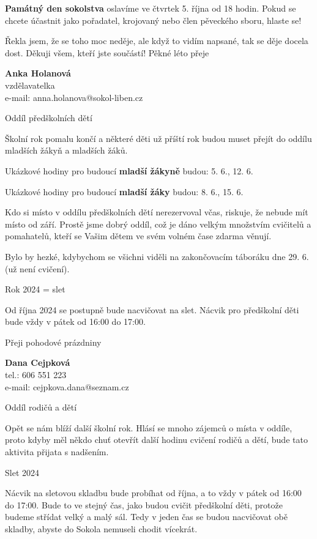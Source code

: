 \documentclass[11pt]{article}
\newcommand{\post}[1]{%
\begin{center}
{\huge \tyrs #1}
\end{center}
}
\newcommand{\subpost}[1]{%
\vspace*{12pt}
\begin{center}
{\Large \tyrs #1}
\end{center}}
\newcommand{\signature}[2]{%
  \begin{flushright}
    \textbf{#1}\\#2
  \end{flushright}
}
\begin{document}
\textbf{Památný den sokolstva} oslavíme ve čtvrtek 5. října od 18 hodin. Pokud se chcete účastnit jako pořadatel, krojovaný nebo člen pěveckého sboru, hlaste se!

Řekla jsem, že se toho moc neděje, ale když to vidím napsané, tak se děje docela dost. Děkuji všem, kteří jste součástí!
Pěkné léto přeje

\signature{Anka Holanová}{vzdělavatelka\\e-mail: anna.holanova@sokol-liben.cz}

\vspace*{24pt}
\clearpage

\post{Oddíl předškolních dětí}
Školní rok pomalu končí a některé děti už příští rok budou muset přejít do oddílu mladších žákyň a mladších žáků. 

\vspace*{6pt}
Ukázkové hodiny pro budoucí \textbf{mladší žákyně} budou: 5. 6., 12. 6.

Ukázkové hodiny pro budoucí \textbf{mladší žáky} budou: 8. 6., 15. 6. 

\vspace*{6pt}
Kdo si místo v oddílu předškolních dětí nerezervoval včas, riskuje, že nebude mít místo od září.
Prostě jsme dobrý oddíl, což je dáno velkým množstvím cvičitelů a pomahatelů, kteří se Vašim dětem ve svém volném čase zdarma věnují.

Bylo by hezké, kdybychom se všichni viděli na zakončovacím táboráku dne 29. 6. (už není cvičení).

\subpost{Rok 2024 = slet}
Od října 2024 se postupně bude nacvičovat na slet. Nácvik pro předškolní děti bude vždy v pátek od 16:00 do 17:00.

Přeji pohodové prázdniny 

\signature{Dana Cejpková}{tel.: 606 551 223\\e-mail: cejpkova.dana@seznam.cz}

\vspace*{24pt}

\post{Oddíl rodičů a dětí}
Opět se nám blíží další školní rok. Hlásí se mnoho zájemců o místa v oddíle, proto kdyby měl někdo chuť otevřít další hodinu cvičení rodičů a dětí, bude tato aktivita přijata s nadšením.

\subpost{Slet 2024}
Nácvik na sletovou skladbu bude probíhat od října, a to vždy v pátek od 16:00 do 17:00. Bude to ve stejný čas, jako budou cvičit předškolní děti, protože budeme střídat velký a malý sál. Tedy v jeden čas se budou nacvičovat obě skladby, abyste do Sokola nemuseli chodit vícekrát.
\end{document}
